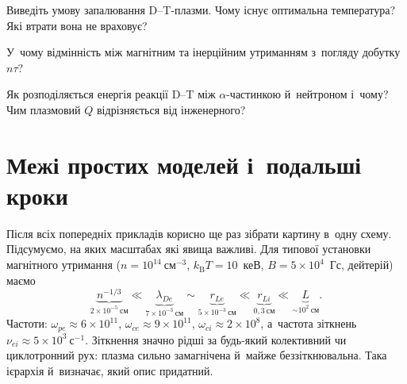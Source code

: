 \begin{Questions}
\begin{quizlist}
\item Виведіть умову запалювання D--T-плазми. Чому існує оптимальна температура?
		  Які втрати вона не враховує?

\item У~чому відмінність між магнітним та інерційним утриманням з~погляду добутку
		  $n\tau$?

\item Як розподіляється енергія реакції D--T між $\alpha$-частинкою й~нейтроном
		  і~чому? Чим плазмовий $Q$ відрізняється від інженерного?

\end{quizlist}
\end{Questions}

\chapter{Межі простих моделей і~подальші кроки}\label{sec:plasma-limits}\hypertarget{plasma-limits}{}

Після всіх попередніх прикладів корисно ще раз зібрати картину в~одну схему. Підсумуємо,
на яких масштабах які явища важливі. Для типової установки магнітного утримання
($n=10^{14}~\mathrm{см}^{-3}$, $k_{\mathrm B}T=10$~кеВ, $B=5\times10^4$~Гс, дейтерій)
маємо
\begin{equation*}
	\underbrace{n^{-1/3}}_{2\times10^{-5}~\text{см}}\ll
	\underbrace{\lambda_{De}}_{7\times10^{-3}~\text{см}}\sim
	\underbrace{r_{Le}}_{5\times10^{-3}~\text{см}}\ll
	\underbrace{r_{Li}}_{0{,}3~\text{см}}\ll
	\underbrace{L}_{\sim10^{2}~\text{см}}.
\end{equation*}
Частоти: $\omega_{pe}\approx6\times10^{11}$, $\omega_{ce}\approx9\times10^{11}$,
$\omega_{ci}\approx2\times10^{8}$, а~частота зіткнень
$\nu_{ei}\approx5\times10^{3}~\mathrm{с}^{-1}$. Зіткнення значно рідші за будь-який
колективний чи циклотронний рух: плазма сильно замагнічена й~майже беззіткнювальна. Така
ієрархія й~визначає, який опис придатний.

